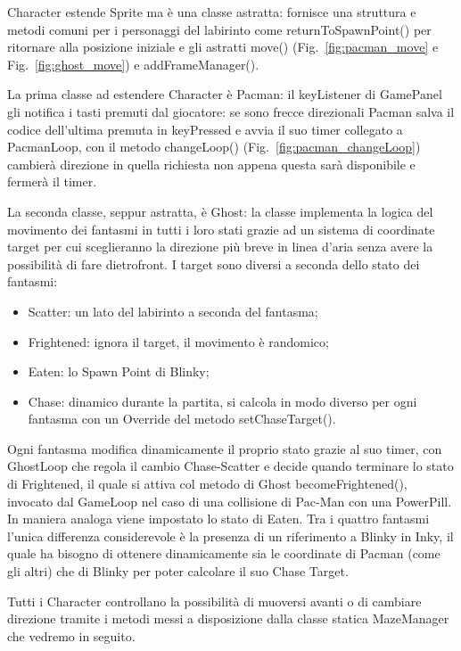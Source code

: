 \documentclass[12pt,a4paper]{report}
\begin{document}
Character estende Sprite ma è una classe astratta: fornisce una struttura e metodi comuni per i personaggi del labirinto come returnToSpawnPoint() per ritornare alla posizione iniziale e gli astratti move() (Fig.~\ref{fig:pacman_move} e Fig.~\ref{fig:ghost_move})  e addFrameManager().

La prima classe ad estendere Character è Pacman: il keyListener di GamePanel gli notifica i tasti premuti dal giocatore: se sono frecce direzionali Pacman salva il codice dell’ultima premuta in keyPressed e avvia il suo timer collegato a PacmanLoop, con il metodo changeLoop() (Fig.~\ref{fig:pacman_changeLoop}) cambierà direzione in quella richiesta non appena questa sarà disponibile e fermerà il timer.

La seconda classe, seppur astratta, è Ghost: la classe implementa la logica del movimento dei fantasmi in tutti i loro stati grazie ad un sistema di coordinate target per cui sceglieranno la direzione più breve in linea d’aria senza avere la possibilità di fare dietrofront. I target sono diversi a seconda dello stato dei fantasmi:
\begin{itemize}
 \item Scatter: un lato del labirinto a seconda del fantasma;
 \item Frightened: ignora il target, il movimento è randomico;
 \item Eaten: lo Spawn Point di Blinky;
 \item Chase: dinamico durante la partita, si calcola in modo diverso per ogni fantasma con un Override del metodo setChaseTarget().
\end{itemize}
Ogni fantasma modifica dinamicamente il proprio stato grazie al suo timer, con GhostLoop che regola il cambio Chase-Scatter e decide quando terminare lo stato di Frightened, il quale si attiva col metodo di Ghost becomeFrightened(), invocato dal GameLoop nel caso di una collisione di Pac-Man con una PowerPill. In maniera analoga viene impostato lo stato di Eaten.
Tra i quattro fantasmi l’unica differenza considerevole è la presenza di un riferimento a Blinky in Inky, il quale ha bisogno di ottenere dinamicamente sia le coordinate di Pacman (come gli altri) che di Blinky per poter calcolare il suo Chase Target.

Tutti i Character controllano la possibilità di muoversi avanti o di cambiare direzione tramite i metodi messi a disposizione dalla classe statica MazeManager che vedremo in seguito.
\end{document}
